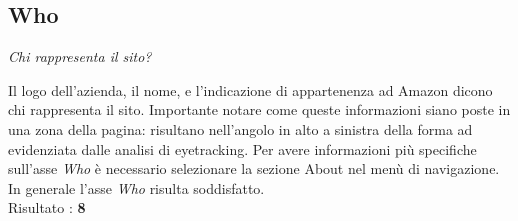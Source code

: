 \subsection{Who}\label{who}
\begin{center}

\textit{Chi rappresenta il sito?}


\end{center}
\begin{flushleft}
Il logo dell'azienda, il nome, e l'indicazione di appartenenza ad Amazon 
dicono chi rappresenta il sito. Importante notare come queste 
informazioni siano poste in una zona  della pagina: risultano 
nell'angolo in alto a sinistra della forma ad  evidenziata 
dalle analisi di eyetracking. Per avere informazioni più specifiche sull'asse \textit{Who}
è necessario selezionare la sezione About nel menù di navigazione. \\
In generale l'asse \textit{Who} risulta soddisfatto. \\
Risultato : \textbf{8}
\end{flushleft}